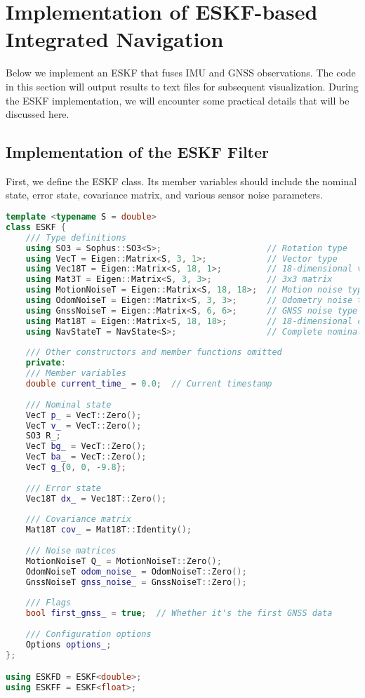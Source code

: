 \section{Implementation of ESKF-based Integrated Navigation}

Below we implement an ESKF that fuses IMU and GNSS observations. The code in this section will output results to text files for subsequent visualization. During the ESKF implementation, we will encounter some practical details that will be discussed here.

\subsection{Implementation of the ESKF Filter}

First, we define the ESKF class. Its member variables should include the nominal state, error state, covariance matrix, and various sensor noise parameters.

\begin{lstlisting}[language=c++,caption=src/ch3/eskf.hpp]
template <typename S = double>
class ESKF {
	/// Type definitions
	using SO3 = Sophus::SO3<S>;                     // Rotation type
	using VecT = Eigen::Matrix<S, 3, 1>;            // Vector type
	using Vec18T = Eigen::Matrix<S, 18, 1>;         // 18-dimensional vector
	using Mat3T = Eigen::Matrix<S, 3, 3>;           // 3x3 matrix
	using MotionNoiseT = Eigen::Matrix<S, 18, 18>;  // Motion noise type
	using OdomNoiseT = Eigen::Matrix<S, 3, 3>;      // Odometry noise type
	using GnssNoiseT = Eigen::Matrix<S, 6, 6>;      // GNSS noise type
	using Mat18T = Eigen::Matrix<S, 18, 18>;        // 18-dimensional covariance
	using NavStateT = NavState<S>;                  // Complete nominal state type
	
	/// Other constructors and member functions omitted
	private:
	/// Member variables
	double current_time_ = 0.0;  // Current timestamp
	
	/// Nominal state
	VecT p_ = VecT::Zero();
	VecT v_ = VecT::Zero();
	SO3 R_;
	VecT bg_ = VecT::Zero();
	VecT ba_ = VecT::Zero();
	VecT g_{0, 0, -9.8};
	
	/// Error state
	Vec18T dx_ = Vec18T::Zero();
	
	/// Covariance matrix
	Mat18T cov_ = Mat18T::Identity();
	
	/// Noise matrices
	MotionNoiseT Q_ = MotionNoiseT::Zero();
	OdomNoiseT odom_noise_ = OdomNoiseT::Zero();
	GnssNoiseT gnss_noise_ = GnssNoiseT::Zero();
	
	/// Flags
	bool first_gnss_ = true;  // Whether it's the first GNSS data
	
	/// Configuration options
	Options options_;
};

using ESKFD = ESKF<double>;
using ESKFF = ESKF<float>;
\end{lstlisting}

